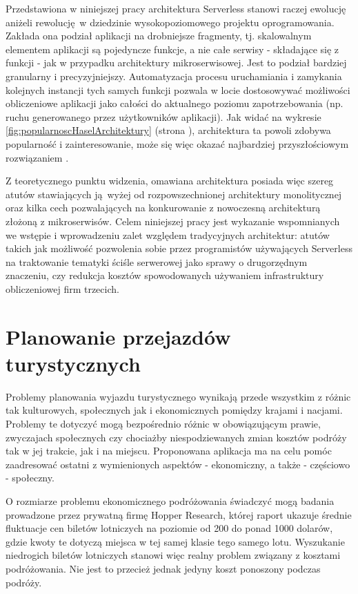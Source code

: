 \documentclass[oneside]{mgr}
\begin{document}
Przedstawiona w niniejszej pracy architektura Serverless stanowi raczej ewolucję aniżeli rewolucję w dziedzinie wysokopoziomowego projektu oprogramowania. Zakłada ona podział aplikacji na drobniejsze fragmenty, tj. skalowalnym elementem aplikacji są pojedyncze funkcje, a nie całe serwisy - składające się z funkcji - jak w przypadku architektury mikroserwisowej. Jest to podział bardziej granularny i precyzyjniejszy. Automatyzacja procesu uruchamiania i zamykania kolejnych instancji tych samych funkcji pozwala w locie dostosowywać możliwości obliczeniowe aplikacji jako całości do aktualnego poziomu zapotrzebowania (np. ruchu generowanego przez użytkowników aplikacji). Jak widać na wykresie \ref{fig:popularnoscHaselArchitektury} (strona \pageref{fig:popularnoscHaselArchitektury}), architektura ta powoli zdobywa popularność i zainteresowanie, może się więc okazać najbardziej przyszłościowym rozwiązaniem \cite{kenFrommFutureIsServerless}.

Z teoretycznego punktu widzenia, omawiana architektura posiada więc szereg atutów stawiających ją wyżej od rozpowszechnionej architektury monolitycznej oraz kilka cech pozwalających na konkurowanie z nowoczesną architekturą złożoną z mikroserwisów. Celem niniejszej pracy jest wykazanie wspomnianych we wstępie i wprowadzeniu zalet względem tradycyjnych architektur: atutów takich jak możliwość pozwolenia sobie przez programistów używających Serverless na traktowanie tematyki ściśle serwerowej jako sprawy o drugorzędnym znaczeniu, czy redukcja kosztów spowodowanych używaniem infrastruktury obliczeniowej firm trzecich.

\section{Planowanie przejazdów turystycznych}
Problemy planowania wyjazdu turystycznego wynikają przede wszystkim z różnic tak kulturowych, społecznych jak i ekonomicznych pomiędzy krajami i nacjami. Problemy te dotyczyć mogą bezpośrednio różnic w obowiązującym prawie, zwyczajach społecznych czy chociażby niespodziewanych zmian kosztów podróży tak w jej trakcie, jak i na miejscu. Proponowana aplikacja ma na celu pomóc zaadresować ostatni z wymienionych aspektów - ekonomiczny, a także - częściowo - społeczny.

O rozmiarze problemu ekonomicznego podróżowania świadczyć mogą badania prowadzone przez prywatną firmę Hopper Research, której raport \cite{hopperReseatchFlightTicketPrices} ukazuje średnie fluktuacje cen biletów lotniczych na poziomie od 200 do ponad 1000 dolarów, gdzie kwoty te dotyczą miejsca w tej samej klasie tego samego lotu. Wyszukanie niedrogich biletów lotniczych stanowi więc realny problem związany z kosztami podróżowania. Nie jest to przecież jednak jedyny koszt ponoszony podczas podróży.
\end{document}
